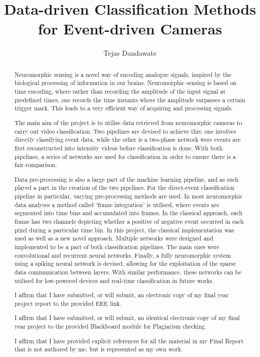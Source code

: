 \documentclass[a4paper, twoside, 11pt]{report}
\title{Data-driven Classification Methods for Event-driven Cameras}
\author{Tejas Dandawate}
\begin{document}


\begin{abstract}
    Neuromorphic sensing is a novel way of encoding analogue signals, inspired by the biological processing of information in our brains. Neuromorphic sensing is based on time encoding, where rather than recording the amplitude of the input signal at predefined times, one records the time instants where the amplitude surpasses a certain trigger mark. This leads to a very efficient way of acquiring and processing signals.

    The main aim of the project is to utilise data retrieved from neuromorphic cameras to carry out video classification. Two pipelines are devised to achieve this; one involves directly classifying event data, while the other is a two-phase network were events are first reconstructed into intensity videos before classification is done. With both pipelines, a series of networks are used for classification in order to ensure there is a fair comparison.
    
    Data pre-processing is also a large part of the machine learning pipeline, and as such played a part in the creation of the two pipelines. For the direct-event classification pipeline in particular, varying pre-processing methods are used. In most neuromorphic data analyses a method called `frame integration' is utilised, where events are segmented into time bins and accumulated into frames. In the classical approach, each frame has two channels depicting whether a positive of negative event occurred in each pixel during a particular time bin. In this project, the classical implementation was used as well as a new novel approach. Multiple networks were designed and implemented to be a part of both classification pipelines. The main ones  were convolutional and recurrent neural networks. Finally, a fully neuromorphic system using a spiking neural network is devised, allowing for the exploitation of the sparse data communication between layers. With similar performance, these networks can be utilised for low-powered devices and real-time classification in future works.
\end{abstract}

\renewcommand{\abstractname}{Final Report Plagiarism Statement}
\begin{abstract}
    I affirm that I have submitted, or will submit, an electronic copy of my final year project report to the provided EEE link.

    I affirm that I have submitted, or will submit, an identical electronic copy of my final year project to the provided Blackboard module for Plagiarism checking.

    I affirm that I have provided explicit references for all the material in my Final Report that is not authored by me, but is represented as my own work.
\end{abstract}
\end{document}
